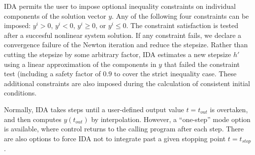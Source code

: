 IDA permits the user to impose optional inequality constraints on individual 
components of the solution vector $y$. Any of the following four constraints 
can be imposed: $y^i > 0$, $y^i < 0$, $y^i \geq 0$, or $y^i \leq 0$. 
The constraint satisfaction is tested after a succesful nonlinear system solution. 
If any constraint fails, we declare a convergence failure of the Newton iteration 
and reduce the stepsize. Rather than cutting the stepsize by some arbitrary factor, 
IDA estimates a new stepsize $h'$ using a linear approximation of the components 
in $y$ that failed the constraint test (including a safety factor of $0.9$ to 
cover the strict inequality case. These additional constraints are also imposed
during the calculation of consistent initial conditions.

Normally, IDA takes steps until a user-defined output value $t = t_{out}$
is overtaken, and then computes $y(t_{out})$ by interpolation.  However,
a ``one-step'' mode option is available, where control returns to the
calling program after each step.  There are also options to force IDA
not to integrate past a given stopping point $t = t_{stop}$.

